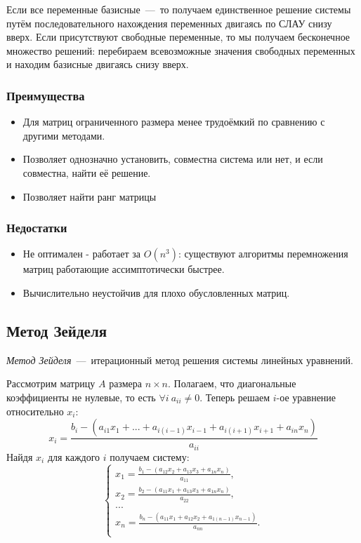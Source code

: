 \documentclass[12pt,a4paper,oneside]{extarticle}
\begin{document}
\begin{enumerate}
                Если все переменные базисные~---~то получаем единственное решение системы путём последовательного нахождения переменных двигаясь по СЛАУ снизу вверх. Если присутствуют свободные переменные, то мы получаем бесконечное множество решений: перебираем всевозможные значения свободных переменных и находим базисные двигаясь снизу вверх.
        \end{enumerate}

        \subsubsection{Преимущества}
            \begin{itemize}
                \item Для матриц ограниченного размера менее трудоёмкий по сравнению с другими методами.
                \item Позволяет однозначно установить, совместна система или нет, и если совместна, найти её решение.
                \item Позволяет найти ранг матрицы
            \end{itemize}
        \subsubsection{Недостатки}
            \begin{itemize}
                \item Не оптимален - работает за $O(n^3)$: существуют алгоритмы перемножения матриц работающие ассимптотически быстрее.
                \item Вычислительно неустойчив для плохо обусловленных матриц.
            \end{itemize}



    \subsection{Метод Зейделя}
        {\it Метод Зейделя}~---~итерационный метод решения системы линейных уравнений.
        
            Рассмотрим матрицу $A$ размера $n\times n$. Полагаем, что диагональные коэффициенты не нулевые, то есть $\forall i ~a_{ii}\neq 0$. Теперь решаем $i$-ое уравнение относительно $x_i$: 
            $$x_i = \frac{b_i-(a_{i1}x_1 + ... + a_{i(i-1)}x_{i-1} + a_{i(i+1)}x_{i+1} + a_{in}x_n)}{a_{ii}}$$
            Найдя $x_i$ для каждого $i$ получаем систему:
            \begin{equation*}
                \begin{cases}
                    x_1 = \frac{b_1-(a_{12}x_2 + a_{13}x_3 + a_{1n}x_n)}{a_{11}}, \\
                    x_2 = \frac{b_2-(a_{11}x_1 + a_{13}x_3 + a_{1n}x_n)}{a_{22}}, \\
                    ... \\
                    x_n = \frac{b_n-(a_{11}x_1 + a_{12}x_2 + a_{1(n-1)}x_{n-1})}{a_{nn}}. \\
                \end{cases}
            \end{equation*}
\end{document}

